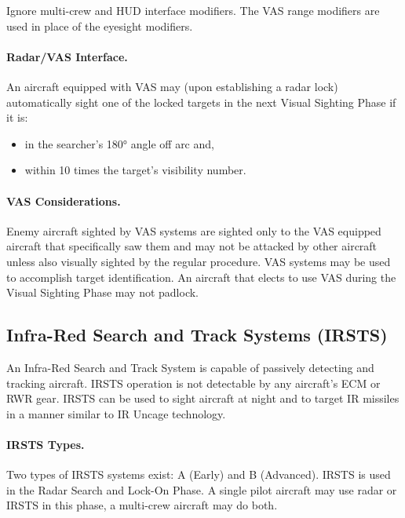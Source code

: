 Ignore multi-crew and HUD interface modifiers. The VAS range modifiers are used in place of the eyesight modifiers.

\paragraph{Radar/VAS Interface.} An aircraft equipped with VAS may (upon establishing a radar lock) automatically sight one of the locked targets in the next Visual Sighting Phase if it is:

\begin{itemize}
    \item in the searcher's 180° angle off arc and,
    \item within 10 times the target's visibility number.
\end{itemize}

\paragraph{VAS Considerations.} Enemy aircraft sighted by VAS systems are sighted only to the VAS equipped aircraft that specifically saw them and may not be attacked by other aircraft unless also visually sighted by the regular procedure. VAS systems may be used to accomplish target identification. An aircraft that elects to use VAS during the Visual Sighting Phase may not padlock.

\subsection{Infra-Red Search and Track Systems (IRSTS)}

An Infra-Red Search and Track System is capable of passively detecting and tracking aircraft. IRSTS operation is not detectable by any aircraft's ECM or RWR gear. IRSTS can be used to sight aircraft at night and to target IR missiles in a manner similar to IR Uncage technology.

\paragraph{IRSTS Types.} Two types of IRSTS systems exist: A (Early) and B (Advanced). IRSTS is used in the Radar Search and Lock-On Phase. A single pilot aircraft may use radar or IRSTS in this phase, a multi-crew aircraft may do both. 


